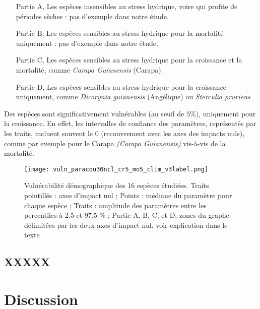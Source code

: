 \documentclass[review]{elsarticle}
\begin{document}
\begin{itemize}
 \item[Partie A,] Les espèces insensibles au stress hydrique, voire qui profite de périodes sèches :  pas d'exemple dans notre étude.
 \item[Partie B,] Les espèces sensibles au stress hydrique pour la mortalité uniquement : pas d'exemple dans notre étude.
 \item[Partie C,]  Les espèces sensibles au stress hydrique pour la croissance et la mortalité, comme {\it Carapa Guianensis} (Carapa).
\item[ Partie D,] Les espèces sensibles au stress hydrique pour la croissance uniquement, comme  {\it Dicorynia guianensis} (Angélique) ou {\it Sterculia pruriens}
\end{itemize}

\noindent Des espèces sont significativement vulnérables (au seuil de $5\%$), uniquement pour la croissance.  En effet, les intervalles de confiance des paramètres, représentés par les traits, incluent souvent le $0$ (recouvrement avec les axes des impacts nuls), comme par exemple pour le Carapa {\it(Carapa Guianensis)} vis-à-vis de la mortalité.


\begin{figure}[!h] 
\begin{center}
\texttt{[image: vuln\_paracou30ncl\_cr5\_mo5\_clim\_v3label.png]}
\caption{Vulnérabilité démographique des 16 espèces étudiées. Traits pointillés : axes d'impact nul ; Points : médiane du paramètre pour chaque espèce ; Traits : amplitude des paramètres entre les percentiles à 2.5 et 97.5 \% ; Partie A, B, C, et D, zones du graphe délimitées par les deux axes d'impact nul, voir explication dans le texte}
\label{fig_impact_mortalite}
\end{center}
\end{figure}
 

\subsection{XXXXX}


%
%
%
%
%
%




\section{Discussion}
\end{document}
